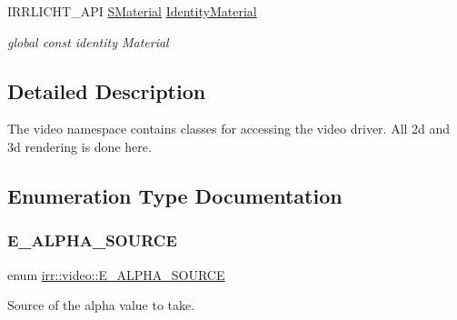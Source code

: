 \begin{DoxyCompactItemize}
\mbox{\label{namespaceirr_1_1video_a6c7a0046dcf64bb165eca2af94045a61}} 
I\+R\+R\+L\+I\+C\+H\+T\+\_\+\+A\+PI \hyperlink{classirr_1_1video_1_1SMaterial}{S\+Material} \hyperlink{namespaceirr_1_1video_a6c7a0046dcf64bb165eca2af94045a61}{Identity\+Material}
\begin{DoxyCompactList}\small\item\em global const identity Material \end{DoxyCompactList}\end{DoxyCompactItemize}


\subsection{Detailed Description}
The video namespace contains classes for accessing the video driver. All 2d and 3d rendering is done here. 

\subsection{Enumeration Type Documentation}
\mbox{\label{namespaceirr_1_1video_a08b237bb445ffc0f32932c8ed87c6e63}} 
\subsubsection{\texorpdfstring{E\+\_\+\+A\+L\+P\+H\+A\+\_\+\+S\+O\+U\+R\+CE}{E\_ALPHA\_SOURCE}}
{\footnotesize\ttfamily enum \hyperlink{namespaceirr_1_1video_a08b237bb445ffc0f32932c8ed87c6e63}{irr\+::video\+::\+E\+\_\+\+A\+L\+P\+H\+A\+\_\+\+S\+O\+U\+R\+CE}}



Source of the alpha value to take. 

